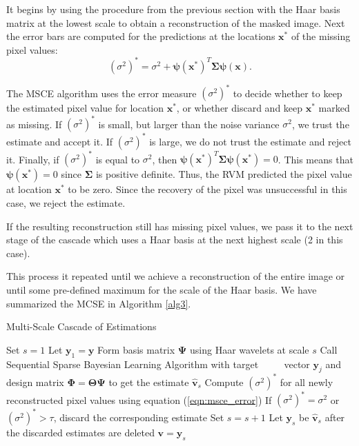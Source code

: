 It begins by using the procedure from the previous section with the Haar basis matrix at the lowest scale to obtain a reconstruction of the masked image.
Next the error bars are computed for the predictions at the locations $\bm x^*$ of the missing pixel values:
\begin{equation}
\label{eqn:msce_error}
  (\sigma^2)^* = \sigma^2 +\bm\psi(\bm x^*)^T\bm\Sigma\bm\psi(\bm x).
\end{equation}

The MSCE algorithm uses the error measure $(\sigma^2)^*$ to decide whether to keep the estimated pixel value for location $\bm x^*$, or whether discard and keep $\bm x^*$ marked as missing.
If $(\sigma^2)^*$ is small, but larger than the noise variance $\sigma^2$, we trust the estimate and accept it. 
If $(\sigma^2)^*$ is large, we do not trust the estimate and reject it.
Finally, if $(\sigma^2)^*$ is equal to $\sigma^2$, then $\bm\psi(\bm x^*)^T\bm\Sigma\bm\psi(\bm x^*) = 0$. 
This means that $\bm\psi(\bm x^*) = 0$ since $\bm\Sigma$ is positive definite.
Thus, the RVM predicted the pixel value at location $\bm x^*$ to be zero. 
Since the recovery of the pixel was unsuccessful in this case, we reject the estimate.

If the resulting reconstruction still has missing pixel values, we pass it to the next stage of the cascade which uses a Haar basis at the next highest scale (2 in this case).

This process it repeated until we achieve a reconstruction of the entire image or until some pre-defined maximum for the scale of the Haar basis.
We have summarized the MCSE in Algorithm \ref{alg3}.

\begin{algorithm}
  \caption{Multi-Scale Cascade of Estimations \cite{pilikos2014}}
  \label{alg3}
  \begin{algorithmic}[1]
    \State Set $s=1$
    \State Let $\bm y_1 = \bm y$
    \State Form basis matrix $\bm\Psi$ using Haar wavelets at scale $s$
    \State Call Sequential Sparse Bayesian Learning Algorithm with target
    \Statex $\qquad$ vector $\bm y_j$ and design matrix $\bm\Phi=\bm\Theta\bm\Psi$ to get the estimate $\bm{\hat v}_s$
    \State Compute $(\sigma^2)^*$ for all newly reconstructed pixel values using equation (\ref{eqn:msce_error})
    \State If $(\sigma^2)^* = \sigma^2$ or $(\sigma^2)^* > \tau$, discard the corresponding estimate
    \State Set $s = s+1$
    \State Let $\bm y_s$ be $\bm{\hat v}_s$ after the discarded estimates are deleted
    \EndWhile
    \State\Return $\bm v = \bm y_s$
  \end{algorithmic}
\end{algorithm}

